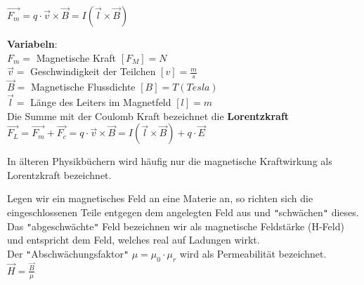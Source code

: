 	\formulaBegin
	$\vec{F_m} = q \cdot \vec{v} \times \vec{B} = I(\vec{l} \times \vec{B})$
	\formulaEnd

	\textbf{Variabeln}: \\
	$ F_m = $ Magnetische Kraft $ [F_M] = N$ \\
	$ \vec{v} = $ Geschwindigkeit der Teilchen $ [v] = \frac{m}{s}$ \\
	$ \vec{B} = $ Magnetische Flussdichte $ [B] = T (Tesla)$ \\
	$ \vec{l} = $ Länge des Leiters im Magnetfeld $ [l] = m $\\

	Die Summe mit der Coulomb Kraft bezeichnet die \textbf{Lorentzkraft} \\

		\formulaBegin
		$\vec{F_L} = \vec{F_m} + \vec{F_c} = q \cdot \vec{v} \times \vec{B} = I(\vec{l} \times \vec{B}) + q \cdot \vec{E} $
		\formulaEnd

		In älteren Physikbüchern wird häufig nur die magnetische Kraftwirkung als Lorentzkraft bezeichnet.

	\iend

\newpage
	\beginip
	Legen wir ein magnetisches Feld an eine Materie an, so richten sich die eingeschlossenen Teile entgegen dem angelegten Feld aus und \texttt{"}schwächen\texttt{"} dieses. \\
	Das \texttt{"}abgeschwächte\texttt{"} Feld bezeichnen wir als magnetische Feldstärke (H-Feld) und entspricht dem Feld, welches real auf Ladungen wirkt. \\
	 Der \texttt{"}Abschwächungsfaktor\texttt{"} $\mu = \mu_0 \cdot \mu_r$ wird als Permeabilität bezeichnet. \\

	\formulaBegin
	$\displaystyle \vec{H} = \frac{\vec{B}}{\mu}$
	\formulaEnd

	\begin{center}
	\end{center}
	\iend


